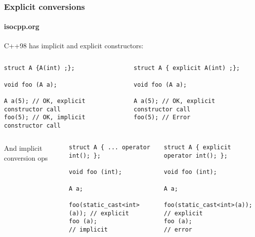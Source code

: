 \begin{frame}[fragile]
\frametitle{Explicit conversions}
\framesubtitle{isocpp.org}
C++98 has implicit and explicit constructors:
\begin{columns}[t]
{\scriptsize
\begin{verbatim}
struct A {A(int) ;};

void foo (A a);

A a(5); // OK, explicit constructor call
foo(5); // OK, implicit constructor call
\end{verbatim}
}
{\scriptsize \begin{verbatim}
struct A { explicit A(int) ;};

void foo (A a);

A a(5); // OK, explicit constructor call
foo(5); // Error
\end{verbatim}
}
\end{columns}

\pause{}
\vskip 6pt
\begin{columns}[t]
{\scriptsize
And implicit conversion ops
\begin{verbatim}
struct A { ... operator int(); };

void foo (int);

A a;

foo(static_cast<int>(a)); // explicit
foo (a);                  // implicit

\end{verbatim}
}
{\scriptsize
{}
\begin{verbatim}
struct A { explicit  operator int(); };

void foo (int);

A a;

foo(static_cast<int>(a)); // explicit
foo (a);                  // error


\end{verbatim}
}
\end{columns}

\end{frame}



